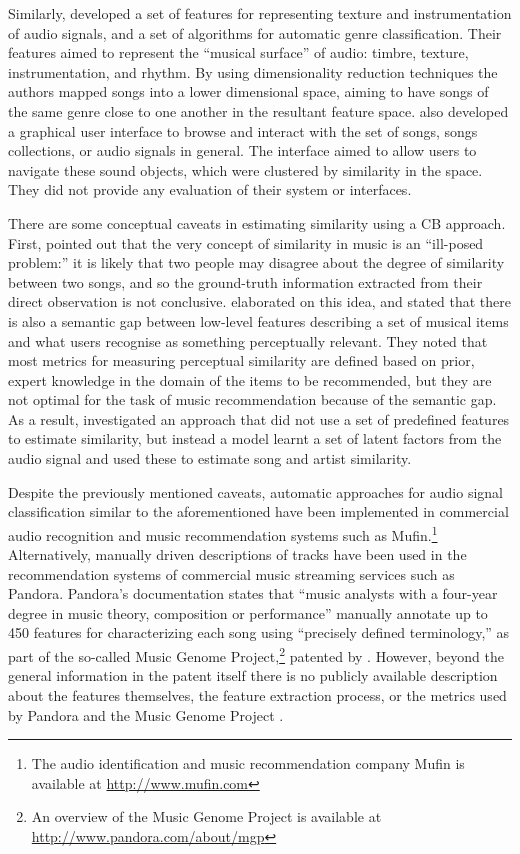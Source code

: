 Similarly, \textcite{tzanetakis01automatic} developed a set of features for representing texture and instrumentation of audio signals, and a set of algorithms for automatic genre classification. Their features aimed to represent the ``musical surface'' of audio: timbre, texture, instrumentation, and rhythm.
By using dimensionality reduction techniques the authors mapped songs into a lower dimensional space, aiming to have songs of the same genre close to one another in the resultant feature space. 
\citeauthor{tzanetakis01automatic} also developed a graphical user interface to browse and interact with the set of songs, songs collections, or audio signals in general.  The interface aimed to allow users to navigate these sound objects, which were clustered by similarity in the space. They did not provide any evaluation of their system or interfaces.

There are some conceptual caveats in estimating similarity using a CB approach. First, \textcite{slaney08learning} pointed out that the very concept of similarity in music is an ``ill-posed problem:'' it is likely that two people may disagree about the degree of similarity between two songs, and so the ground-truth information extracted from their direct observation is not conclusive. \textcite{van13deep} elaborated on this idea, and stated that there is also a semantic gap between low-level features describing a set of musical items and what users recognise as something perceptually relevant. They noted that most metrics for measuring perceptual similarity are defined based on prior, expert knowledge in the domain of the items to be recommended, but they are not optimal for the task of music recommendation because of the semantic gap.
As a result, \citeauthor{van13deep} investigated an approach that did not use a set of predefined features to estimate similarity, but instead a model learnt a set of latent factors from the audio signal and used these to estimate song and artist similarity.




Despite the previously mentioned caveats, automatic approaches for audio signal classification similar to the aforementioned have been implemented in commercial audio recognition and music recommendation systems such as Mufin.\footnote{The audio identification and music recommendation company Mufin is available at \url{http://www.mufin.com}} 
Alternatively, manually driven descriptions of tracks have been used in the recommendation systems of commercial music streaming services such as Pandora.
Pandora's documentation states that ``music analysts with a four-year degree in music theory, composition or performance'' manually annotate up to 450 features for characterizing each song using ``precisely defined terminology,'' as part of the so-called Music Genome Project,\footnote{An overview of the Music Genome Project is available at \url{http://www.pandora.com/about/mgp}} patented by \textcite{glaser06consumer}. 
However, beyond the general information in the patent itself there is no publicly available description about the features themselves, the feature extraction process, or the metrics used by Pandora and the Music Genome Project \autocite{turnbull08dissertation}. 

